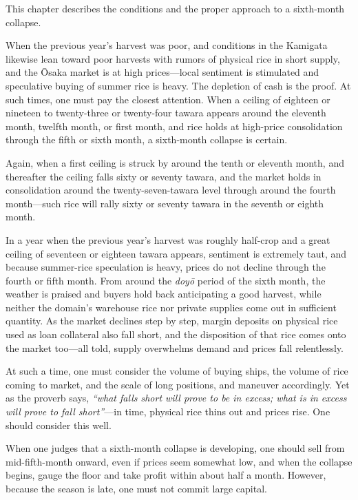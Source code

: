 \commentary
This chapter describes the conditions and the proper approach to a
sixth-month collapse.

When the previous year's harvest was poor, and conditions in the
Kamigata likewise lean toward poor harvests with rumors of physical rice
in short supply, and the \=Osaka market is at high prices---local
sentiment is stimulated and speculative buying of summer rice is heavy.
The depletion of cash is the proof. At such times, one must pay the
closest attention. When a ceiling of eighteen or nineteen to twenty-three
or twenty-four tawara appears around the eleventh month, twelfth month,
or first month, and rice holds at high-price consolidation through the
fifth or sixth month, a sixth-month collapse is certain.

Again, when a first ceiling is struck by around the tenth or eleventh
month, and thereafter the ceiling falls sixty or seventy tawara, and the
market holds in consolidation around the twenty-seven-tawara level
through around the fourth month---such rice will rally sixty or seventy
tawara in the seventh or eighth month.

In a year when the previous year's harvest was roughly half-crop and a
great ceiling of seventeen or eighteen tawara appears, sentiment is
extremely taut, and because summer-rice speculation is heavy, prices do
not decline through the fourth or fifth month. From around the
\textit{doy\=o} period of the sixth month, the weather is praised and
buyers hold back anticipating a good harvest, while neither the domain's
warehouse rice nor private supplies come out in sufficient quantity. As
the market declines step by step, margin deposits on physical rice used
as loan collateral also fall short, and the disposition of that rice
comes onto the market too---all told, supply overwhelms demand and
prices fall relentlessly.

At such a time, one must consider the volume of buying ships, the volume
of rice coming to market, and the scale of long positions, and maneuver
accordingly. Yet as the proverb says, \textit{``what falls short will
prove to be in excess; what is in excess will prove to fall
short''}---in time, physical rice thins out and prices rise. One should
consider this well.

When one judges that a sixth-month collapse is developing, one should
sell from mid-fifth-month onward, even if prices seem somewhat low, and
when the collapse begins, gauge the floor and take profit within about
half a month. However, because the season is late, one must not commit
large capital.

